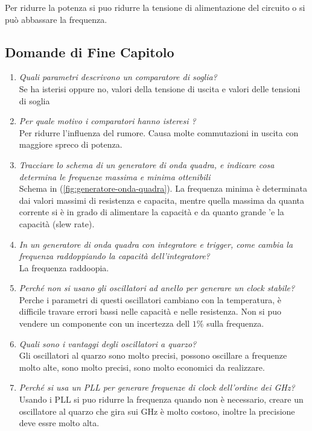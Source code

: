 \documentclass[12pt]{article}
\begin{document}
Per ridurre la potenza si puo ridurre la tensione di alimentazione del circuito o si pu\`o abbassare la frequenza.


\subsection{Domande di Fine Capitolo}
\begin{enumerate}
    \item \emph{Quali parametri descrivono un comparatore di soglia?} \\
        Se ha isterisi oppure no, valori della tensione di uscita e valori delle tensioni di soglia

    \item \emph{Per quale motivo i comparatori hanno isteresi ?} \\
        Per ridurre l'influenza del rumore. Causa molte commutazioni in uscita con maggiore spreco di potenza.

    \item \emph{Tracciare lo schema di un generatore di onda quadra, e indicare cosa determina le frequenze massima e minima ottenibili} \\
        Schema in (\autoref{fig:generatore-onda-quadra}). La frequenza minima \`e determinata dai valori massimi di resistenza e capacita, mentre quella massima da quanta corrente si \`e in grado di alimentare la capacit\`a e da quanto grande 'e la capacit\`a (slew rate).

    \item \emph{In un generatore di onda quadra con integratore e trigger, come cambia la frequenza raddoppiando la capacità dell’integratore?} \\
        La frequenza raddoopia.

    \item \emph{Perché non si usano gli oscillatori ad anello per generare un clock stabile?} \\
        Perche i parametri di questi oscillatori cambiano con la temperatura, \`e difficile travare errori bassi nelle capacit\`a e nelle resistenza. Non si puo vendere un componente con un incertezza dell $1\%$ sulla frequenza.

    \item \emph{Quali sono i vantaggi degli oscillatori a quarzo?} \\
        Gli oscillatori al quarzo sono molto precisi, possono oscillare a frequenze molto alte, sono molto precisi, sono molto economici da realizzare.

    \item \emph{Perché si usa un PLL per generare frequenze di clock dell’ordine dei GHz?} \\
        Usando i PLL si puo ridurre la frequenza quando non \`e necessario, creare un oscillatore al quarzo che gira sui GHz \`e molto costoso, inoltre la precisione deve essre molto alta.
\end{enumerate}
\end{document}
